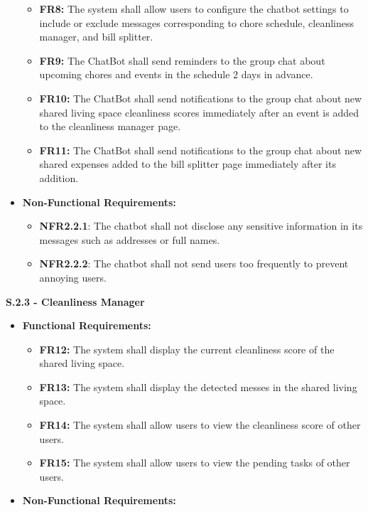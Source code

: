 \documentclass{scrreprt}
\theoremstyle{definition}
\begin{document}
\begin{flushleft}
\begin{itemize}
  		\begin{itemize}
  			\item \textbf{FR8:} The system shall allow users to configure the chatbot settings to include or exclude messages corresponding to chore schedule, cleanliness manager, and bill splitter.
            \item \textbf{FR9:} The ChatBot shall send reminders to the group chat about upcoming chores and events in the schedule 2 days in advance.
            \item \textbf{FR10:} The ChatBot shall send notifications to the group chat about new shared living space cleanliness scores immediately after an event is added to the cleanliness manager page.
            \item \textbf{FR11:} The ChatBot shall send notifications to the group chat about new shared expenses added to the bill splitter page immediately after its addition.
  		\end{itemize}
  		\item \textbf{Non-Functional Requirements:}
  		\begin{itemize}
  			\item \textbf{NFR2.2.1}: The chatbot shall not disclose any sensitive information in its messages such as addresses or full names.
  			\item \textbf{NFR2.2.2}: The chatbot shall not send users too frequently to prevent annoying users.
  		\end{itemize}
  	\end{itemize}
  	\item \textbf{S.2.3 - Cleanliness Manager}
  	\begin{itemize}
  		\item \textbf{Functional Requirements:}
  		\begin{itemize}
  			\item \textbf{FR12:} The system shall display the current cleanliness score of the shared living space.
            \item \textbf{FR13:} The system shall display the detected messes in the shared living space.
            \item \textbf{FR14:} The system shall allow users to view the cleanliness score of other users.
            \item \textbf{FR15:} The system shall allow users to view the pending tasks of other users.
  		\end{itemize}
  		\item \textbf{Non-Functional Requirements:}

\end{itemize}
\end{flushleft}
\end{document}

